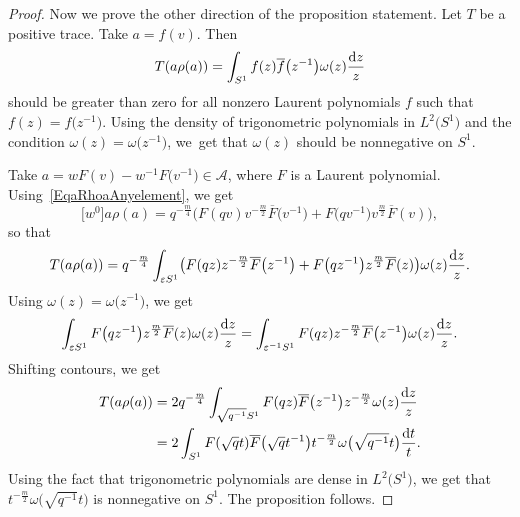 \documentclass[pdftex]{sigma}
\newcommand\eps{\varepsilon}
\newcommand{\mc}{\mathcal}
\newcommand{\ovl}{\overline}
\numberwithin{equation}{section}
\theoremstyle{definition}
\begin{document}
\begin{proof}
 Now we prove the other direction of the proposition statement. Let $T$ be a positive trace. Take $a=f(v)$. Then \[T(a\rho(a))=\int_{S^1}f(z)\ovl{f}\bigl(z^{-1}\bigr)\omega(z)\frac{{\rm d}z}z\] should be greater than zero for all nonzero Laurent polynomials $f$ such that $f(z)=f\bigl(z^{-1}\bigr)$. Using the density of trigonometric polynomials in $L^2\bigl(S^1\bigr)$ and the condition $\omega(z)=\omega\bigl(z^{-1}\bigr)$, we~get that $\omega(z)$ should be nonnegative on $S^1$.

 Take $a=wF(v)-w^{-1}F\bigl(v^{-1}\bigr)\in\mc{A}$, where $F$ is a Laurent polynomial. Using~\eqref{EqaRhoaAnyelement}, we get
 \[\big[w^0\big]a\rho(a)=q^{-\frac{m}{4}}\bigl(F(qv)v^{-\frac{m}{2}}\ovl{F}\bigl(v^{-1}\bigr)+F\bigl(qv^{-1}\bigr)v^{\frac{m}{2}}\ovl{F}(v)\bigr),\] so that
 \[T(a\rho(a))=q^{-\frac{m}{4}}\int_{\eps S^1}\bigl(F(qz)z^{-\frac{m}{2}}\ovl{F}\bigl(z^{-1}\bigr)+F\bigl(qz^{-1}\bigr)z^{\frac{m}{2}}\ovl{F}(z)\bigr)\omega(z)\frac{{\rm d}z}{z}.\]
 Using $\omega(z)=\omega\bigl(z^{-1}\bigr)$, we get
 \[\int_{\eps S^1}F\bigl(qz^{-1}\bigr)z^{\frac{m}{2}}\ovl{F}(z)\omega(z)\frac{{\rm d}z}{z}=\int_{\eps^{-1}S^1}F(qz)z^{-\frac{m}{2}}\ovl{F}\bigl(z^{-1}\bigr)\omega(z)\frac{{\rm d}z}{z}.\]
 Shifting contours, we get
 \begin{align*}
 T(a\rho(a))={}&2q^{-\frac{m}{4}}\int_{\sqrt{q^{-1}}S^1}F(qz)\ovl{F}\bigl(z^{-1}\bigr)z^{-\frac{m}{2}}\omega(z)\frac{{\rm d}z}{z}\\
 ={}&2\int_{S^1}F(\sqrt{q}t)\ovl{F}\bigl(\sqrt{q}t^{-1}\bigr)t^{-\frac{m}{2}}\omega\bigl(\sqrt{q^{-1}}t\bigr)\frac{{\rm d}t}{t}.
 \end{align*}
 Using the fact that trigonometric polynomials are dense in $L^2\bigl(S^1\bigr)$, we get that $t^{-\frac{m}{2}}\omega\bigl(\sqrt{q^{-1}}t\bigr)$ is nonnegative on $S^1$. The proposition follows.
 \end{proof}
\end{document}
